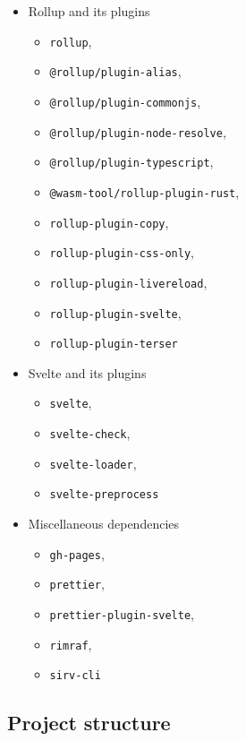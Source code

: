 \documentclass[english,engineering]{wizthesis}
\begin{document}
\begin{itemize}
  \item Rollup and its plugins
  \begin{itemize}[noitemsep,nolistsep]
    \item \texttt{rollup},
    \item \texttt{@rollup/plugin-alias},
    \item \texttt{@rollup/plugin-commonjs},
    \item \texttt{@rollup/plugin-node-resolve},
    \item \texttt{@rollup/plugin-typescript},
    \item \texttt{@wasm-tool/rollup-plugin-rust},
    \item \texttt{rollup-plugin-copy},
    \item \texttt{rollup-plugin-css-only},
    \item \texttt{rollup-plugin-livereload},
    \item \texttt{rollup-plugin-svelte},
    \item \texttt{rollup-plugin-terser}
  \end{itemize}
  \item Svelte and its plugins
  \begin{itemize}[noitemsep,nolistsep]
    \item \texttt{svelte},
    \item \texttt{svelte-check},
    \item \texttt{svelte-loader},
    \item \texttt{svelte-preprocess}
  \end{itemize}
  \item Miscellaneous dependencies
  \begin{itemize}[noitemsep,nolistsep]
    \item \texttt{gh-pages},
    \item \texttt{prettier},
    \item \texttt{prettier-plugin-svelte},
    \item \texttt{rimraf},
    \item \texttt{sirv-cli}
  \end{itemize}
\end{itemize}

\newpage

\subsection{Project structure} \label{sbs:project-structure}
\end{document}
